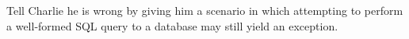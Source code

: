 \documentclass[exam,ans]{yqteach}
\begin{document}
\maketitle

\begin{markingsummary}
\end{markingsummary}

\pagebreak



 Tell Charlie he is wrong by giving him a scenario in which attempting to perform a well-formed SQL query to a database may still yield an exception.


\extraspace
{}


\endofdocument
\end{document}
